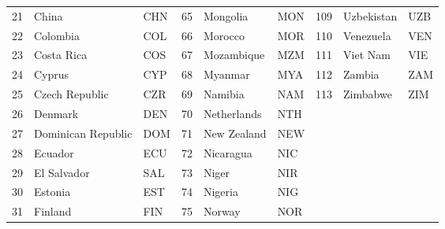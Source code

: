 \begin{table}[!htb]
{\begin{tabular}{@{}rllllllll@{}}
			21                               & China              & CHN          & 65           & Mongolia              & MON                   & 109          & Uzbekistan               & UZB                   \\
			22                               & Colombia           & COL          & 66           & Morocco               & MOR                   & 110          & Venezuela                & VEN                   \\
			23                               & Costa Rica         & COS          & 67           & Mozambique            & MZM                   & 111          & Viet Nam                 & VIE                   \\
			24                               & Cyprus             & CYP          & 68           & Myanmar               & MYA                   & 112          & Zambia                   & ZAM                   \\
			25                               & Czech Republic     & CZR          & 69           & Namibia               & NAM                   & 113          & Zimbabwe                 & ZIM                   \\
			26                               & Denmark            & DEN          & 70           & Netherlands           & NTH                   &              &                          &                       \\
			27                               & Dominican Republic & DOM          & 71           & New Zealand           & NEW                   &              &                          &                       \\
			28                               & Ecuador            & ECU          & 72           & Nicaragua             & NIC                   &              &                          &                       \\
			29                               & El Salvador        & SAL          & 73           & Niger                 & NIR                   &              &                          &                       \\
			30                               & Estonia            & EST          & 74           & Nigeria               & NIG                   &              &                          &                       \\
			31                               & Finland            & FIN          & 75           & Norway                & NOR                   &              &                          &                       \\

\end{tabular}}
\end{table}
